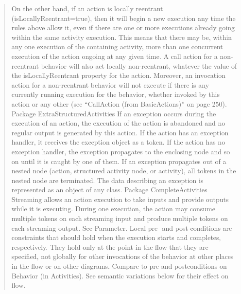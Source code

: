 \begin{quotation}
On the other hand, if an action is locally reentrant (isLocallyReentrant=true), then it will begin a new execution any time
the rules above allow it, even if there are one or more executions already going within the same activity execution. This
means that there may be, within any one execution of the containing activity, more than one concurrent execution of the
action ongoing at any given time.
A call action for a non-reentrant behavior will also act locally non-reentrant, whatever the value of the isLocallyReentrant
property for the action. Moreover, an invocation action for a non-reentrant behavior will not execute if there is any
currently running execution for the behavior, whether invoked by this action or any other (see “CallAction (from
BasicActions)” on page 250).
Package ExtraStructuredActivities
If an exception occurs during the execution of an action, the execution of the action is abandoned and no regular output
is generated by this action. If the action has an exception handler, it receives the exception object as a token. If the action
has no exception handler, the exception propagates to the enclosing node and so on until it is caught by one of them. If an
exception propagates out of a nested node (action, structured activity node, or activity), all tokens in the nested node are
terminated. The data describing an exception is represented as an object of any class.
Package CompleteActivities
Streaming allows an action execution to take inputs and provide outputs while it is executing. During one execution, the
action may consume multiple tokens on each streaming input and produce multiple tokens on each streaming output. See
Parameter.
Local pre- and post-conditions are constraints that should hold when the execution starts and completes, respectively.
They hold only at the point in the flow that they are specified, not globally for other invocations of the behavior at other
places in the flow or on other diagrams. Compare to pre and postconditions on Behavior (in Activities). See semantic
variations below for their effect on flow.
\end{quotation}


